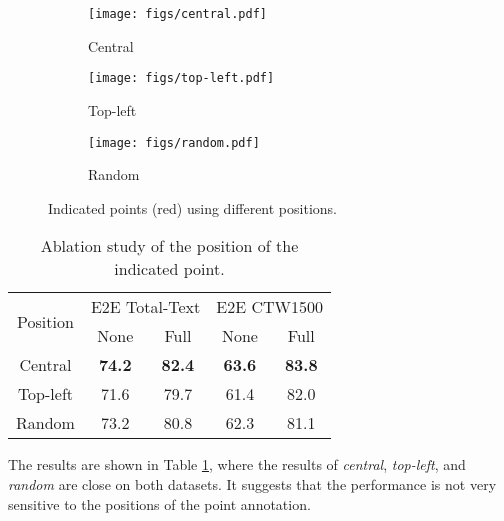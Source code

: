 \documentclass[sigconf]{acmart}
\begin{document}
\begin{figure}[t!]
    \centering
    \begin{subfigure}{0.3\linewidth}
        \texttt{[image: figs/central.pdf]}
        \caption{Central}
        \label{fig:ctr}
    \end{subfigure}
    \begin{subfigure}{0.3\linewidth}
        \texttt{[image: figs/top-left.pdf]}
        \caption{Top-left}
        \label{fig:tl}
    \end{subfigure}
    \begin{subfigure}{0.3\linewidth}
        \texttt{[image: figs/random.pdf]}
        \caption{Random}
        \label{fig:rand}
    \end{subfigure}
    \caption{Indicated points (red) using different positions.}
    \label{fig:pts_pos}
\end{figure}
    
\begin{table}[t!]
    \centering
\caption{Ablation study of the position of the indicated point.}
    \label{tab:ab1_position_point}
    \footnotesize
    \begin{tabular}{c|cc|cc}\hline
    \multirow{2}{*}{Position} & \multicolumn{2}{c|}{E2E Total-Text} & \multicolumn{2}{c}{E2E CTW1500} \\ \cline{2-5} 
     & \multicolumn{1}{c|}{None} & Full & \multicolumn{1}{c|}{None} & \multicolumn{1}{c}{Full} \\ \hline
    Central & \textbf{74.2} & \textbf{82.4} & \textbf{63.6} & \textbf{83.8} \\
    Top-left & 71.6 & 79.7 & 61.4 & 82.0 \\
    Random & 73.2 & 80.8 & 62.3 & 81.1 \\ \hline
    \end{tabular}
\end{table}

The results are shown in Table \ref{tab:ab1_position_point}, where the results of \emph{central}, \emph{top-left}, and \emph{random} are close on both datasets. It suggests that the performance is not very sensitive to the positions of the point annotation.
\end{document}

